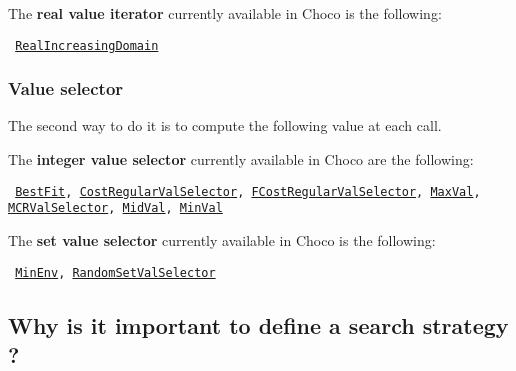 \noindent The \textbf{real value iterator} currently available in Choco is the following: 
\begin{notedef}\tt
\hyperlink{realincreasingdomain:realincreasingdomainvaliterator}{RealIncreasingDomain}
\end{notedef}




\subsubsection{Value selector}\label{solver:valueselector}\hypertarget{solver:valueselector}{}
The second way to do it is to compute the following value at each call.

\noindent The \textbf{integer value selector} currently available in Choco are the following: 
\begin{notedef}\tt
\hyperlink{bestfit:bestfitvalselector}{BestFit}, \hyperlink{costregularvalselector:costregularvalselectorvalselector}{CostRegularValSelector}, \hyperlink{fcostregularvalselector:fcostregularvalselectorvalselector}{FCostRegularValSelector}, \hyperlink{maxval:maxvalvalselector}{MaxVal}, \hyperlink{mcrvalselector:mcrvalselectorvalselector}{MCRValSelector}, \hyperlink{midval:midvalvalselector}{MidVal}, \hyperlink{minval:minvalvalselector}{MinVal}
\end{notedef}

\noindent The \textbf{set value selector} currently available in Choco is the following: 
\begin{notedef}\tt
\hyperlink{minenv:minenvvalselector}{MinEnv}, \hyperlink{randomsetvalselector:randomsetvalselectorvalselector}{RandomSetValSelector}
\end{notedef}

\subsection{Why is it important to define a search strategy ?}\label{solver:whyisitimportanttodefineasearchstrategy}\hypertarget{solver:whyisitimportanttodefineasearchstrategy}{}

